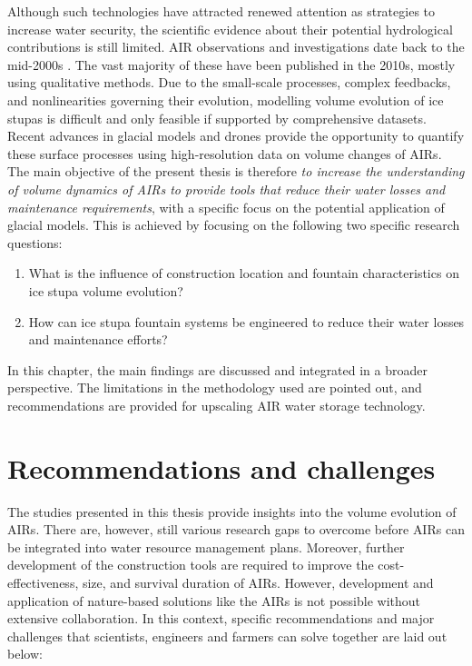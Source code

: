 Although such technologies have attracted renewed attention as strategies to increase water security, the scientific evidence about their potential hydrological contributions is still limited. AIR observations and investigations
date back to the mid-2000s \citep{tveitenGlacierGrowingLocal2007}. The vast majority of these have been published in the
2010s, mostly using qualitative methods. Due to the small-scale processes, complex feedbacks, and nonlinearities
governing their evolution, modelling volume evolution of ice stupas is difficult and only feasible if supported
by comprehensive datasets. Recent advances in glacial models and drones provide the opportunity to quantify
these surface processes using high-resolution data on volume changes of \ac{AIRs}. The main objective of the present
thesis is therefore \textit{to increase the understanding of volume dynamics of \ac{AIRs} to provide tools
that reduce their water losses and maintenance requirements}, with a specific focus on the potential application
of glacial models. This is achieved by focusing on the following two specific research questions:

\begin{enumerate}
  \item{What is the influence of construction location and fountain characteristics on ice stupa volume
    evolution?}
  \item{How can ice stupa fountain systems be engineered to reduce their water losses and maintenance efforts?}
\end{enumerate}

In this chapter, the main findings are discussed and integrated in a broader perspective. The limitations in the
methodology used are pointed out, and recommendations are provided for upscaling AIR water storage technology.

\section{Recommendations and challenges}

The studies presented in this thesis provide insights into the volume evolution of \ac{AIRs}. There are,
however, still various research gaps to overcome before \ac{AIRs} can be integrated into water resource
management plans. Moreover, further development of the construction tools are required to improve the
cost-effectiveness, size, and survival duration of \ac{AIRs}. However, development and application of
nature-based solutions like the \ac{AIRs} is not possible without extensive collaboration. In this context,
specific recommendations and major challenges that scientists, engineers and farmers can solve together are laid
out below:

